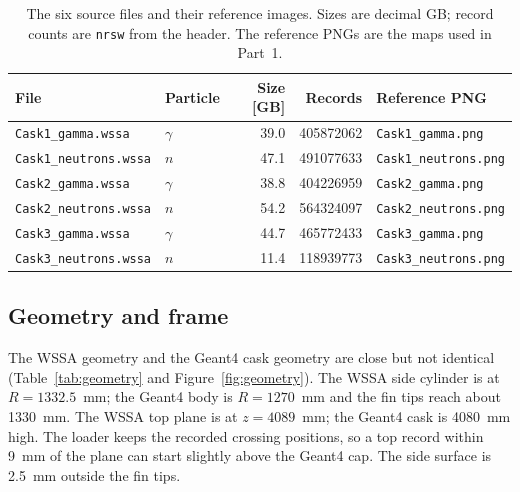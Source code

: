 \documentclass[11pt,a4paper]{article}
\begin{document}
\begin{table}[t]
\centering
\caption{The six source files and their reference images.  Sizes are decimal
GB; record counts are \texttt{nrsw} from the header.  The reference PNGs are the
maps used in Part~1.}
\label{tab:files}
\footnotesize
\setlength{\tabcolsep}{4pt}
\begin{tabular}{@{}l l r r l@{}}
\toprule
File & Particle & Size [GB] & Records & Reference PNG \\
\midrule
\texttt{Cask1\_gamma.wssa}    & $\gamma$ & 39.0 & \num{405872062} & \texttt{Cask1\_gamma.png} \\
\texttt{Cask1\_neutrons.wssa} & $n$ & 47.1 & \num{491077633} & \texttt{Cask1\_neutrons.png} \\
\texttt{Cask2\_gamma.wssa}    & $\gamma$ & 38.8 & \num{404226959} & \texttt{Cask2\_gamma.png} \\
\texttt{Cask2\_neutrons.wssa} & $n$ & 54.2 & \num{564324097} & \texttt{Cask2\_neutrons.png} \\
\texttt{Cask3\_gamma.wssa}    & $\gamma$ & 44.7 & \num{465772433} & \texttt{Cask3\_gamma.png} \\
\texttt{Cask3\_neutrons.wssa} & $n$ & 11.4 & \num{118939773} & \texttt{Cask3\_neutrons.png} \\
\bottomrule
\end{tabular}
\end{table}

\subsection{Geometry and frame}

The WSSA geometry and the Geant4 cask geometry are close but not identical
(Table~\ref{tab:geometry} and Figure~\ref{fig:geometry}).  The WSSA side
cylinder is at $R=1332.5$~mm; the Geant4 body is $R=1270$~mm and the fin tips
reach about 1330~mm.  The WSSA top plane is at $z=4089$~mm; the Geant4 cask is
4080~mm high.  The loader keeps the recorded crossing positions, so a top
record within 9~mm of the plane can start slightly above the Geant4 cap.  The
side surface is 2.5~mm outside the fin tips.
\end{document}
